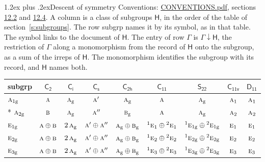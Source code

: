 \documentclass[10pt,a4paper]{article}
\makeatletter
\renewcommand\section{\@startsection{section}{1}{\z@}{-3ex plus -1ex minus -.2ex}%
  {1.2ex plus .2ex}{\normalfont\large\sffamily\bfseries\color{parttitle}}}
\numberwithin{equation}{section}
\newcommand{\grp}[1]{\mathsf{#1}}
\newcommand{\irr}[1]{\text{\normalfont\scshape #1}}
\newcommand{\conjpair}[1]{{}^{#1}}
\newcommand{\ptag}[1]{\mathrm{#1}}
\newcommand{\restr}[2]{#1\!\downarrow#2}
\makeatother
\begin{document}
\section{Descent of symmetry}\label{s:subduction}
Conventions: \href{../../CONVENTIONS.pdf}{CONVENTIONS.pdf}, sections \href{../../CONVENTIONS.pdf\#conv.12.2}{12.2} and \href{../../CONVENTIONS.pdf\#conv.12.4}{12.4}.
A column is a class of subgroups $\grp{H}$, in the order of the table of section~\ref{s:subgroups}. The row subgrp names it by its symbol, as in that table. The symbol links to the document of $\grp{H}$. The entry of row $\Gamma$ is $\restr{\Gamma}{\grp{H}}$, the restriction of $\Gamma$ along a monomorphism from the record of $\grp{H}$ onto the subgroup, as a sum of the irreps of $\grp{H}$. The monomorphism identifies the subgroup with its record, and $\grp{H}$ names both.
{\small\begin{longtable}{@{}lcccccccc@{}}\toprule
subgrp & \href{C2.pdf}{$\grp{C_{2}}$} & \href{S2.pdf}{$\grp{C_{i}}$} & \href{C1v.pdf}{$\grp{C_{s}}$} & \href{C2h.pdf}{$\grp{C_{2h}}$} & \href{C11.pdf}{$\grp{C_{11}}$} & \href{S22.pdf}{$\grp{S_{22}}$} & \href{C11v.pdf}{$\grp{C_{11v}}$} & \href{D11.pdf}{$\grp{D_{11}}$}\\\midrule\endhead
\bottomrule\endfoot\endlastfoot
$\irr{a}_{1\ptag{g}}$ & $\irr{a}$ & $\irr{a}_{\ptag{g}}$ & $\irr{a}'$ & $\irr{a}_{\ptag{g}}$ & $\irr{a}$ & $\irr{a}_{\ptag{g}}$ & $\irr{a}_{1}$ & $\irr{a}_{1}$\\*
$\irr{a}_{2\ptag{g}}$ & $\irr{b}$ & $\irr{a}_{\ptag{g}}$ & $\irr{a}''$ & $\irr{b}_{\ptag{g}}$ & $\irr{a}$ & $\irr{a}_{\ptag{g}}$ & $\irr{a}_{2}$ & $\irr{a}_{2}$\\
$\irr{e}_{1\ptag{g}}$ & $\irr{a}\oplus \irr{b}$ & $2\,\irr{a}_{\ptag{g}}$ & $\irr{a}'\oplus \irr{a}''$ & $\irr{a}_{\ptag{g}}\oplus \irr{b}_{\ptag{g}}$ & $\conjpair{1}\irr{e}_{1}\oplus \conjpair{2}\irr{e}_{1}$ & $\conjpair{1}\irr{e}_{1\ptag{g}}\oplus \conjpair{2}\irr{e}_{1\ptag{g}}$ & $\irr{e}_{1}$ & $\irr{e}_{1}$\\
$\irr{e}_{2\ptag{g}}$ & $\irr{a}\oplus \irr{b}$ & $2\,\irr{a}_{\ptag{g}}$ & $\irr{a}'\oplus \irr{a}''$ & $\irr{a}_{\ptag{g}}\oplus \irr{b}_{\ptag{g}}$ & $\conjpair{1}\irr{e}_{2}\oplus \conjpair{2}\irr{e}_{2}$ & $\conjpair{1}\irr{e}_{2\ptag{g}}\oplus \conjpair{2}\irr{e}_{2\ptag{g}}$ & $\irr{e}_{2}$ & $\irr{e}_{2}$\\
$\irr{e}_{3\ptag{g}}$ & $\irr{a}\oplus \irr{b}$ & $2\,\irr{a}_{\ptag{g}}$ & $\irr{a}'\oplus \irr{a}''$ & $\irr{a}_{\ptag{g}}\oplus \irr{b}_{\ptag{g}}$ & $\conjpair{1}\irr{e}_{3}\oplus \conjpair{2}\irr{e}_{3}$ & $\conjpair{1}\irr{e}_{3\ptag{g}}\oplus \conjpair{2}\irr{e}_{3\ptag{g}}$ & $\irr{e}_{3}$ & $\irr{e}_{3}$\\

\end{longtable}}
\end{document}

